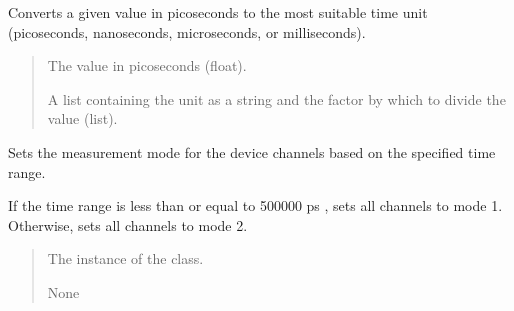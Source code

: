 \documentclass[letterpaper,10pt,english]{sphinxmanual}
\begin{document}
\begin{fulllineitems}
\begin{fulllineitems}
\sphinxAtStartPar
Converts a given value in picoseconds to the most suitable time unit (picoseconds, nanoseconds, microseconds, or milliseconds).
\begin{quote}\begin{description}
\sphinxAtStartPar
{} \textendash{} The value in picoseconds (float).

\sphinxAtStartPar
A list containing the unit as a string and the factor by which to divide the value (list).

\end{description}\end{quote}

\end{fulllineitems}


\begin{fulllineitems}
\label{\detokenize{FLIMGraphics:FLIMGraphics.WorkerThreadFLIM.measurementMode}}
\pysigstartsignatures
{}
\pysigstopsignatures
\sphinxAtStartPar
Sets the measurement mode for the device channels based on the specified time range.

\sphinxAtStartPar
If the time range is less than or equal to 500000 ps , sets all channels to mode 1.
Otherwise, sets all channels to mode 2.
\begin{quote}\begin{description}
\sphinxAtStartPar
{} \textendash{} The instance of the class.

\sphinxAtStartPar
None

\end{description}\end{quote}

\end{fulllineitems}


\begin{fulllineitems}
\label{\detokenize{FLIMGraphics:FLIMGraphics.WorkerThreadFLIM.pointSignal}}
\pysigstartsignatures
{}
\pysigstopsignatures
\end{fulllineitems}


\end{fulllineitems}
\end{document}
